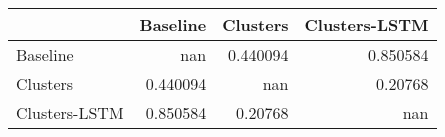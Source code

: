 \begin{tabular}{lrrr}
\toprule
               &   Baseline &   Clusters &   Clusters-LSTM \\
\midrule
 Baseline      & nan        &   0.440094 &        0.850584 \\
 Clusters      &   0.440094 & nan        &        0.20768  \\
 Clusters-LSTM &   0.850584 &   0.20768  &      nan        \\
\bottomrule
\end{tabular}